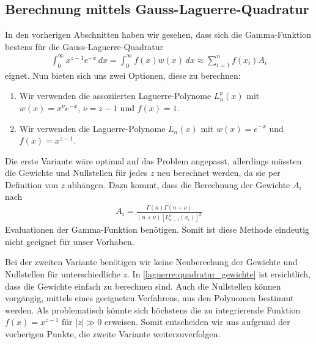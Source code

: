 \subsection{Berechnung mittels
Gauss-Laguerre-Quadratur%
\label{laguerre:subsection:gauss-lag-gamma}}
In den vorherigen Abschnitten haben wir gesehen,
dass sich die Gamma-Funktion bestens für die Gauss-Laguerre-Quadratur
\begin{align*}
\int_0^\infty x^{z-1} e^{-x} \, dx
=
\int_0^\infty f(x) w(x) \, dx
\approx
\sum_{i=1}^n f(x_i) A_i
\end{align*}
eignet.
Nun bieten sich uns zwei Optionen,
diese zu berechnen:
\begin{enumerate}
\item Wir verwenden die assoziierten Laguerre-Polynome $L_n^\nu(x)$ mit
$w(x) = x^\nu e^{-x}$, $\nu = z - 1$ und $f(x) = 1$.
\item Wir verwenden die Laguerre-Polynome $L_n(x)$ mit
$w(x) = e^{-x}$ und $f(x) = x^{z - 1}$.
\end{enumerate}
Die erste Variante wäre optimal auf das Problem angepasst,
allerdings müssten die Gewichte und Nullstellen für jedes $z$
neu berechnet werden,
da sie per Definition von $z$ abhängen.
Dazu kommt,
dass die Berechnung der Gewichte $A_i$ nach
\cite{laguerre:Cassity1965AbcissasCA}
\begin{align*}
A_i
=
\frac{
\Gamma(n) \Gamma(n+\nu)
}
{
(n+\nu)
\left[L_{n-1}^{\nu}(x_i)\right]^2
}
\end{align*}
Evaluationen der Gamma-Funktion benötigen.
Somit ist diese Methode eindeutig nicht geeignet für unser Vorhaben.

Bei der zweiten Variante benötigen wir keine Neuberechung der Gewichte
und Nullstellen für unterschiedliche $z$.
In \eqref{laguerre:quadratur_gewichte} ist ersichtlich,
dass die Gewichte einfach zu berechnen sind.
Auch die Nullstellen können vorgängig,
mittels eines geeigneten Verfahrens,
aus den Polynomen bestimmt werden.
Als problematisch könnte sich höchstens
die zu integrierende Funktion $f(x)=x^{z-1}$ für $|z| \gg 0$ erweisen.
Somit entscheiden wir uns aufgrund der vorherigen Punkte,
die zweite Variante weiterzuverfolgen.

